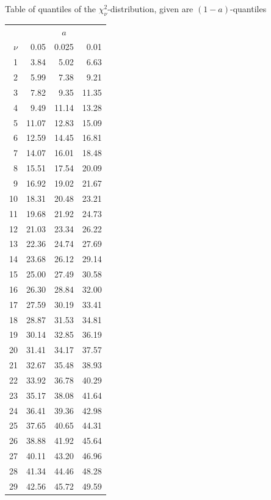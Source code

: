 \documentclass{article}
\begin{document}
	\begin{minipage}[t]{6cm}
		Table of quantiles of the $\chi^2_{\nu }$-distribution, given are $(1-a)$-quantiles
		
		\begin{center}
			\begin{tabular}{|r|rrr|}
				\hline
				& \multicolumn{3}{|c|}{$a$} \\ 
				$\nu$ & 0.05 & 0.025 & 0.01 \\ \hline
				1 & 3.84 & 5.02 & 6.63 \\
				2 & 5.99 & 7.38 & 9.21 \\
				3 & 7.82 & 9.35 & 11.35 \\
				4 & 9.49 & 11.14 & 13.28 \\
				5 & 11.07 & 12.83 & 15.09 \\
				6 & 12.59 & 14.45 & 16.81 \\
				7 & 14.07 & 16.01 & 18.48 \\
				8 & 15.51 & 17.54 & 20.09 \\
				9 & 16.92 & 19.02 & 21.67 \\
				10 & 18.31 & 20.48 & 23.21 \\
				11 & 19.68 & 21.92 & 24.73 \\
				12 & 21.03 & 23.34 & 26.22 \\
				13 & 22.36 & 24.74 & 27.69 \\
				14 & 23.68 & 26.12 & 29.14 \\
				15 & 25.00 & 27.49 & 30.58 \\
				16 & 26.30 & 28.84 & 32.00 \\
				17 & 27.59 & 30.19 & 33.41 \\
				18 & 28.87 & 31.53 & 34.81 \\
				19 & 30.14 & 32.85 & 36.19 \\
				20 & 31.41 & 34.17 & 37.57 \\
				21 & 32.67 & 35.48 & 38.93 \\
				22 & 33.92 & 36.78 & 40.29 \\
				23 & 35.17 & 38.08 & 41.64 \\
				24 & 36.41 & 39.36 & 42.98 \\
				25 & 37.65 & 40.65 & 44.31 \\
				26 & 38.88 & 41.92 & 45.64 \\
				27 & 40.11 & 43.20 & 46.96 \\
				28 & 41.34 & 44.46 & 48.28 \\
				29 & 42.56 & 45.72 & 49.59 \\

\end{tabular}
\end{center}
\end{minipage}
\end{document}
